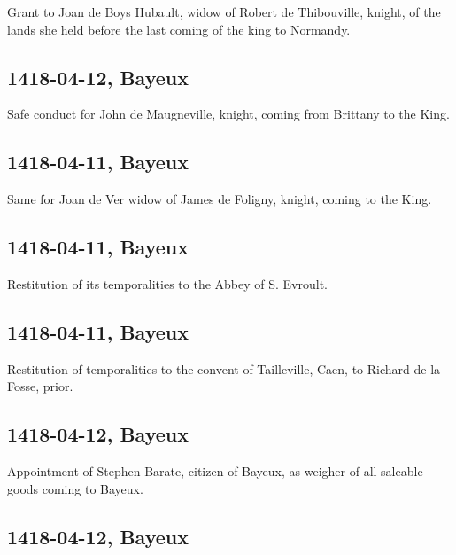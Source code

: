 \documentclass[a4paper,12pt,twoside]{book}
\begin{document}
                     Grant to Joan de Boys Hubault, widow of Robert de Thibouville, knight, of the lands she held before the last coming of the king to Normandy.
                  
            \subsection{1418-04-12, Bayeux}
            
                     Safe conduct for John de Maugneville, knight, coming from Brittany to the King.
                  
            \subsection{1418-04-11, Bayeux}
            
                     Same for Joan de Ver widow of James de Foligny, knight, coming to the King.
                  
            \subsection{1418-04-11, Bayeux}
            
                     Restitution of its temporalities to the Abbey of S. Evroult.
                  
            \subsection{1418-04-11, Bayeux}
            
                     Restitution of temporalities to the convent of Tailleville, Caen, to Richard de la Fosse, prior.
                  
            \subsection{1418-04-12, Bayeux}
            
                     Appointment of Stephen Barate, citizen of Bayeux, as weigher of all saleable goods coming to Bayeux.
                  
            \subsection{1418-04-12, Bayeux}
            
\end{document}
